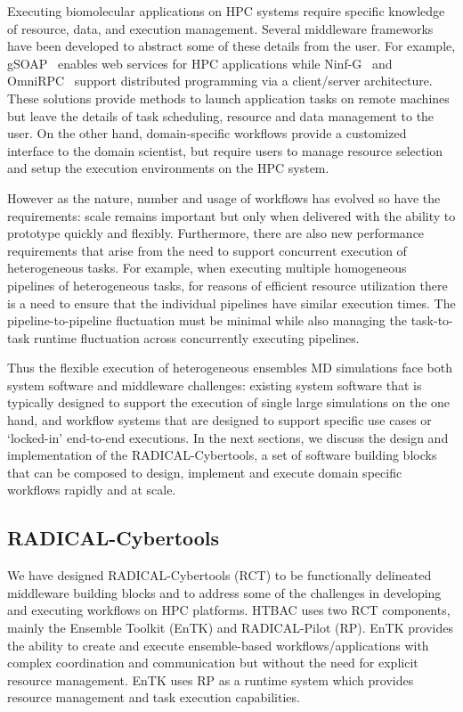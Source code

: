 \documentclass{bmcart}
\begin{document}
Executing biomolecular applications on HPC systems require specific knowledge 
of resource, data, and execution management. Several middleware frameworks~\cite{middleware} 
have been developed to abstract some of these details from the user. 
For example, gSOAP~\cite{gsoap} enables web 
services for HPC applications while Ninf-G~\cite{ninf} and OmniRPC~\cite{omnirpc} support distributed 
programming via a client/server architecture. These solutions provide methods
to launch application tasks on remote machines but leave the details of task 
scheduling, resource and data management to the user. On the other hand, 
domain-specific workflows provide a customized interface to the domain 
scientist, but require users to manage resource selection and setup the 
execution environments on the HPC system. 

However as the nature, number and usage of workflows has evolved so have the
requirements: scale remains important but only when delivered with the
ability to prototype quickly and flexibly. Furthermore, there are also new
performance requirements that arise from the need to support concurrent
execution of heterogeneous tasks. For example, when executing multiple
homogeneous pipelines of heterogeneous tasks, for reasons of efficient
resource utilization there is a need to ensure that the individual pipelines
have similar execution times. The pipeline-to-pipeline fluctuation must be
minimal while also managing the task-to-task runtime fluctuation across
concurrently executing pipelines.

Thus the flexible execution of heterogeneous ensembles MD simulations face
both system software and middleware challenges: existing system software that
is typically designed to support the execution of single large simulations on
the one hand, and workflow systems that are designed to support specific use
cases or `locked-in' end-to-end executions. In the next sections, we discuss
the design and implementation of the RADICAL-Cybertools, a set of software
building blocks that can be composed to design, implement and execute
domain specific workflows rapidly and at scale.


\subsection{RADICAL-Cybertools}\label{ssec:RCT}

We have designed RADICAL-Cybertools (RCT) to be functionally delineated
middleware building blocks and to address some of the challenges in
developing and executing workflows on HPC platforms. HTBAC uses two RCT
components, mainly the Ensemble Toolkit (EnTK) and RADICAL-Pilot (RP).
EnTK provides the ability to create and execute ensemble-based
workflows/applications with complex coordination and communication but
without the need for explicit resource management. EnTK uses RP as a
runtime system which provides resource management and task execution
capabilities.
\end{document}
